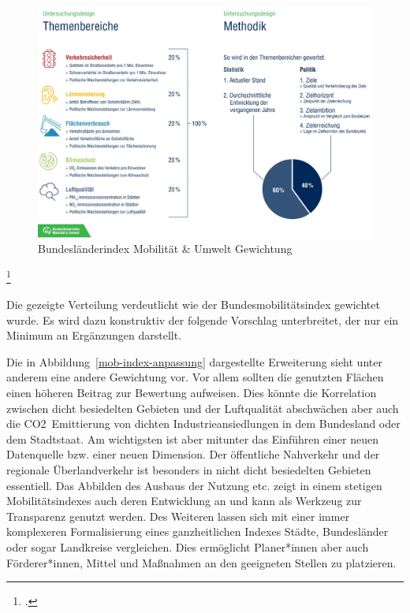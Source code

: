 \begin{figure}[H]
\includegraphics[width=14cm]{abbildungen/mob-index2018-Verteilung}
\centering
\caption[Bundesländerindex Mobilität \& Umwelt Gewichtung]{Bundesländerindex Mobilität \& Umwelt Gewichtung\footnotemark}
\label{mob-index2018-Verteilung}
\end{figure}
\footcitetext{Bundeslaenderindex:1}

Die gezeigte Verteilung verdeutlicht wie der Bundesmobilitätsindex gewichtet wurde. Es wird dazu konstruktiv der folgende Vorschlag unterbreitet, der nur ein Minimum an Ergänzungen darstellt.


Die in Abbildung~\ref{mob-index-anpassung} dargestellte Erweiterung sieht unter anderem eine andere Gewichtung vor. Vor allem sollten die genutzten Flächen einen höheren Beitrag zur Bewertung aufweisen. Dies könnte die Korrelation zwischen dicht besiedelten Gebieten und der Luftqualität abschwächen aber auch die CO2~Emittierung von dichten Industrieansiedlungen in dem Bundesland oder dem Stadtstaat.
Am wichtigsten ist aber mitunter das Einführen einer neuen Datenquelle bzw. einer neuen Dimension. Der öffentliche Nahverkehr und der regionale Überlandverkehr ist besonders in nicht dicht besiedelten Gebieten essentiell.
Das Abbilden des Ausbaus der Nutzung etc. zeigt in einem stetigen Mobilitätsindexes auch deren Entwicklung an und kann als Werkzeug zur Transparenz genutzt werden.
Des Weiteren lassen sich mit einer immer komplexeren Formalisierung eines ganzheitlichen Indexes Städte, Bundesländer oder sogar Landkreise vergleichen. Dies ermöglicht Planer*innen aber auch Förderer*innen, Mittel und Maßnahmen an den geeigneten Stellen zu platzieren.
